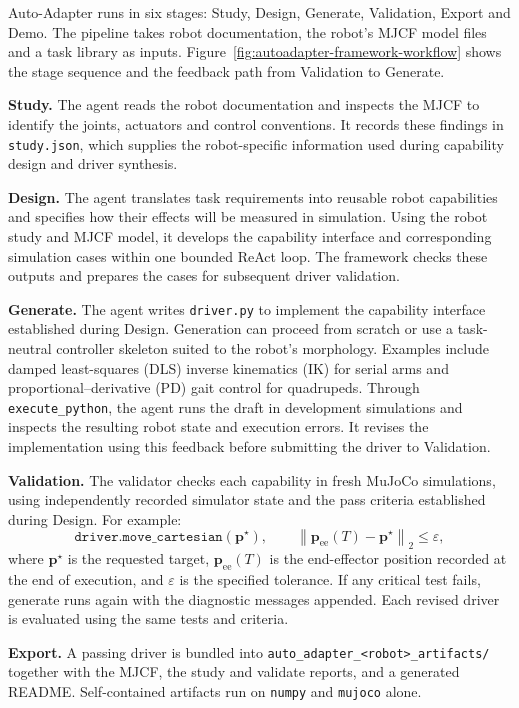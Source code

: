 Auto-Adapter runs in six stages: Study, Design, Generate, Validation, Export
and Demo. The pipeline takes robot documentation, the robot's MJCF model files
and a task library as inputs.
Figure~\ref{fig:autoadapter-framework-workflow} shows the stage sequence and
the feedback path from Validation to Generate.

\textbf{Study.} The agent reads the robot documentation and inspects the MJCF
to identify the joints, actuators and control conventions. It records these
findings in \texttt{study.json}, which supplies the robot-specific information
used during capability design and driver synthesis.

\textbf{Design.} The agent translates task requirements into reusable robot
capabilities and specifies how their effects will be measured in simulation.
Using the robot study and MJCF model, it develops the capability interface and
corresponding simulation cases within one bounded ReAct loop. The framework
checks these outputs and prepares the cases for subsequent driver validation.

\textbf{Generate.} The agent writes \texttt{driver.py} to implement the
capability interface established during Design. Generation can proceed from
scratch or use a task-neutral controller skeleton suited to the robot's
morphology. Examples include damped least-squares (DLS) inverse kinematics (IK)
for serial arms and proportional--derivative (PD) gait control for quadrupeds.
Through \texttt{execute\_python}, the agent runs the draft in development
simulations and inspects the resulting robot state and execution errors. It
revises the implementation using this feedback before submitting the driver
to Validation.

\textbf{Validation.} The validator checks each capability in fresh MuJoCo
simulations, using independently recorded simulator state and the pass criteria
established during Design.
For example:
\[
\texttt{driver.move\_cartesian}(\mathbf p^\star),
\qquad
\left\|\mathbf p_{\mathrm{ee}}(T)-\mathbf p^\star\right\|_2
\leq \varepsilon,
\]
where \(\mathbf p^\star\) is the requested target,
\(\mathbf p_{\mathrm{ee}}(T)\) is the end-effector position recorded at the end
of execution, and \(\varepsilon\) is the specified tolerance. If any critical
test fails, generate runs again with the diagnostic messages appended. Each
revised driver is evaluated using the same tests and criteria.

\textbf{Export.} A passing driver is bundled into
\texttt{auto\_adapter\_\textless robot\textgreater\_artifacts/} together
with the MJCF, the study and validate reports, and a generated README.
Self-contained artifacts run on \texttt{numpy} and \texttt{mujoco} alone.


